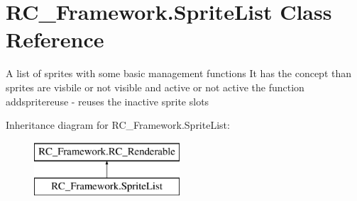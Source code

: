 \hypertarget{class_r_c___framework_1_1_sprite_list}{}\section{R\+C\+\_\+\+Framework.\+Sprite\+List Class Reference}
\label{class_r_c___framework_1_1_sprite_list}


A list of sprites with some basic management functions It has the concept than sprites are visbile or not visible and active or not active the function addspritereuse -\/ reuses the inactive sprite slots  


Inheritance diagram for R\+C\+\_\+\+Framework.\+Sprite\+List\+:\begin{figure}[H]
\begin{center}
\leavevmode
\includegraphics[height=2.000000cm]{class_r_c___framework_1_1_sprite_list}
\end{center}
\end{figure}
